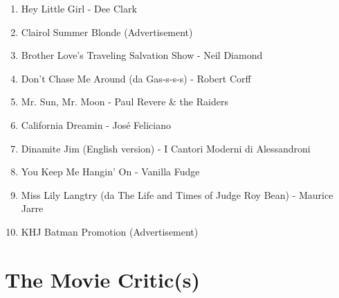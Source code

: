 \documentclass[12pt]{article} %
\begin{document}
\begin{enumerate}
                                    \item Hey Little Girl - Dee Clark
                                    \item Clairol Summer Blonde (Advertisement)
                                    \item Brother Love's Traveling Salvation Show - Neil Diamond
                                    \item Don't Chase Me Around (da Gas-s-s-s) - Robert Corff
                                    \item Mr. Sun, Mr. Moon - Paul Revere \& the Raiders
                                    \item California Dreamin - José Feliciano
                                    \item Dinamite Jim (English version) - I Cantori Moderni di Alessandroni
                                    \item You Keep Me Hangin' On - Vanilla Fudge
                                    \item Miss Lily Langtry (da The Life and Times of Judge Roy Bean) - Maurice Jarre
                                    \item KHJ Batman Promotion (Advertisement)
                                \end{enumerate}
                                \break

\section{The Movie Critic(s)}
\end{document}
